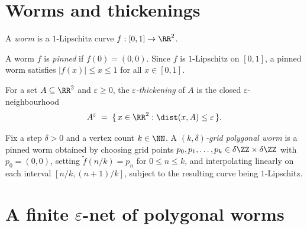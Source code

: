 


\section{Worms and thickenings}

\begin{definition}[Worm]
    \label{def:worm}
    A \emph{worm} is a $1$-Lipschitz curve $f : [0,1] \to \RR^2$.
\end{definition}

\begin{definition}
    \label{def:pinnedWorm}
    A worm $f$ is \emph{pinned} if $f(0) = (0,0)$. Since $f$ is $1$-Lipschitz
    on $[0,1]$, a pinned worm satisfies $\lvert f(x) \rvert \le x \le 1$ for
    all $x \in [0,1]$.
\end{definition}

\begin{definition}
    \label{def:thickening}
    For a set $A \subseteq \RR^2$ and $\varepsilon \ge 0$, the
    \emph{$\varepsilon$-thickening} of $A$ is the closed
    $\varepsilon$-neighbourhood
    \[
        A^{\varepsilon} \;=\; \{\, x \in \RR^2 : \dist(x, A) \le \varepsilon \,\}.
    \]
\end{definition}

\begin{definition}
    \label{def:gridPolygonalWorm}
    Fix a step $\delta > 0$ and a vertex count $k \in \NN$. A
    \emph{$(k,\delta)$-grid polygonal worm} is a pinned worm obtained by
    choosing grid points $p_0, p_1, \dots, p_k \in \delta\ZZ \times \delta\ZZ$
    with $p_0 = (0,0)$, setting $\tilde f(n/k) = p_n$ for $0 \le n \le k$, and
    interpolating linearly on each interval $[n/k, (n+1)/k]$, subject to the
    resulting curve being $1$-Lipschitz.
\end{definition}

\section{A finite \texorpdfstring{$\varepsilon$}{epsilon}-net of polygonal worms}

